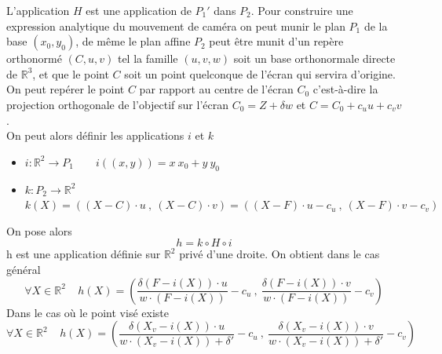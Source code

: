 L'application $H$ est une application de $P_{1}'$ dans $P_{2}$. Pour construire une expression analytique du mouvement de caméra on peut munir le plan $P_{1}$ de la base $(x_{0},y_{0})$, de même le plan affine $P_{2}$ peut être munit d'un repère orthonormé $(C,u,v)$ tel la famille $(u,v,w)$ soit un base orthonormale directe de $\mathbb{R}^{3}$, et que le point $C$ soit un point quelconque de l'écran qui servira d'origine.\\
On peut repérer le point $C$ par rapport au centre de l'écran $C_{0}$ c'est-à-dire la projection orthogonale de l'objectif sur l'écran $C_{0}=Z+\delta w$ et $C=C_{0}+c_{u}u+c_{v}v$.\\
On peut alors définir les applications $i$ et $k$
\begin{itemize}
\item $i:\mathbb{R}^{2}\rightarrow P_{1}$~~~~$i((x,y))=x~x_{0}+y~y_{0}$
\item $k:P_{2}\rightarrow \mathbb{R}^{2}$~~~~$k(X)= ((X-C)\cdot u~,~(X-C)\cdot v)=((X-F)\cdot u-c_{u}~,~ (X-F)\cdot v-c_{v})$
\end{itemize}
On pose alors 
\begin{equation*}
h=k\circ H \circ i
\end{equation*}
h est une application définie sur $\mathbb{R}^{2}$ privé d'une droite. On obtient dans le cas général
\begin{equation*}
\forall X\in \mathbb{R}^{2} ~~~~~h(X)=\left(\frac{\delta (F-i(X))\cdot u}{w \cdot (F-i(X))}-c_{u}~,~\frac{\delta (F-i(X))\cdot v}{w \cdot (F-i(X))} -c_{v} \right) 
\end{equation*} 
Dans le cas où le point visé existe
\begin{equation*}
\forall X\in \mathbb{R}^{2} ~~~~~h(X)=\left(\frac{\delta (X_{v}-i(X))\cdot u}{w \cdot (X_{v}-i(X))+\delta'}-c_{u}~,~\frac{\delta (X_{v}-i(X))\cdot v}{w \cdot (X_{v}-i(X))+\delta'} -c_{v} \right) 
\end{equation*}



